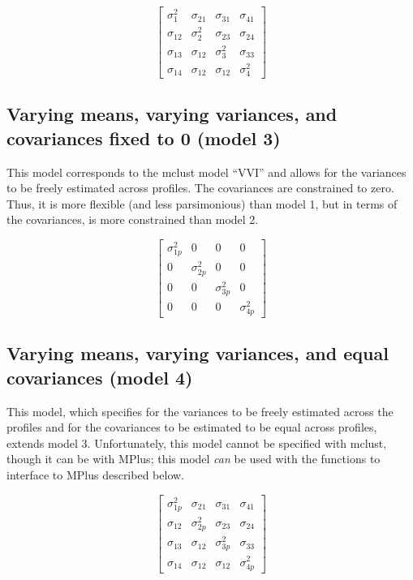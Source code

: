 \documentclass[]{msu-thesis}
\theoremstyle{definition}
\theoremstyle{definition}
\theoremstyle{definition}
\theoremstyle{remark}
\begin{document}
\[
\left[ \begin{matrix} { \sigma }_{ 1 }^{ 2 } & { \sigma }_{ 21 } & { \sigma }_{ 31 } & { \sigma }_{ 41 } \\ { \sigma }_{ 12 } & { \sigma }_{ 2 }^{ 2 } & { \sigma }_{ 23 } & { \sigma }_{ 24 } \\ { \sigma }_{ 13 } & { \sigma }_{ 12 } & { \sigma }_{ 3 }^{ 2 } & { \sigma }_{ 33 } \\ { \sigma }_{ 14 } & { \sigma }_{ 12 } & { \sigma }_{ 12 } & { \sigma }_{ 4 }^{ 2 } \end{matrix} \right]
\]

\subsection{Varying means, varying variances, and covariances fixed to 0
(model
3)}\label{varying-means-varying-variances-and-covariances-fixed-to-0-model-3}

This model corresponds to the mclust model ``VVI'' and allows for the
variances to be freely estimated across profiles. The covariances are
constrained to zero. Thus, it is more flexible (and less parsimonious)
than model 1, but in terms of the covariances, is more constrained than
model 2.

\[
\left[ \begin{matrix} { \sigma }_{ 1p }^{ 2 } & 0 & 0 & 0 \\ 0 & { \sigma }_{ 2p }^{ 2 } & 0 & 0 \\ 0 & 0 & { \sigma }_{ 3p }^{ 2 } & 0 \\ 0 & 0 & 0 & { \sigma }_{ 4p }^{ 2 } \end{matrix} \right]
\]

\subsection{Varying means, varying variances, and equal covariances
(model
4)}\label{varying-means-varying-variances-and-equal-covariances-model-4}

This model, which specifies for the variances to be freely estimated
across the profiles and for the covariances to be estimated to be equal
across profiles, extends model 3. Unfortunately, this model cannot be
specified with mclust, though it can be with MPlus; this model
\emph{can} be used with the functions to interface to MPlus described
below.

\[
\left[ \begin{matrix} { \sigma }_{ 1p }^{ 2 } & { \sigma }_{ 21 } & { \sigma }_{ 31 } & { \sigma }_{ 41 } \\ { \sigma }_{ 12 } & { \sigma }_{ 2p }^{ 2 } & { \sigma }_{ 23 } & { \sigma }_{ 24 } \\ { \sigma }_{ 13 } & { \sigma }_{ 12 } & { \sigma }_{ 3p }^{ 2 } & { \sigma }_{ 33 } \\ { \sigma }_{ 14 } & { \sigma }_{ 12 } & { \sigma }_{ 12 } & { \sigma }_{ 4p }^{ 2 } \end{matrix} \right]
\]
\end{document}
